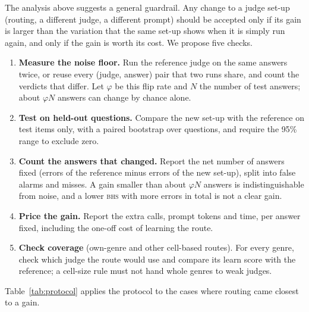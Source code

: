 \documentclass[pdflatex,sn-apa]{sn-jnl}
\newcommand{\BHS}{\textsc{bhs}}
\begin{document}
The analysis above suggests a general guardrail. Any change to a judge set-up (routing, a different judge, a different
prompt) should be accepted only if its gain is larger than the variation that the same set-up shows when it is simply
run again, and only if the gain is worth its cost. We propose five checks.

\begin{enumerate}
  \item \textbf{Measure the noise floor.} Run the reference judge on the same answers twice, or reuse every
  (judge, answer) pair that two runs share, and count the verdicts that differ. Let $\varphi$ be this flip rate and
  $N$ the number of test answers; about $\varphi N$ answers can change by chance alone.
  \item \textbf{Test on held-out questions.} Compare the new set-up with the reference on test items only, with a
  paired bootstrap over questions, and require the 95\% range to exclude zero.
  \item \textbf{Count the answers that changed.} Report the net number of answers fixed (errors of the reference
  minus errors of the new set-up), split into false alarms and misses. A gain smaller than about $\varphi N$ answers
  is indistinguishable from noise, and a lower \BHS{} with more errors in total is not a clear gain.
  \item \textbf{Price the gain.} Report the extra calls, prompt tokens and time, per answer fixed, including the
  one-off cost of learning the route.
  \item \textbf{Check coverage} (own-genre and other cell-based routes). For every genre, check which judge the route
  would use and compare its learn score with the reference; a cell-size rule must not hand whole genres to weak judges.
\end{enumerate}

Table~\ref{tab:protocol} applies the protocol to the cases where routing came closest to a gain.
\end{document}
